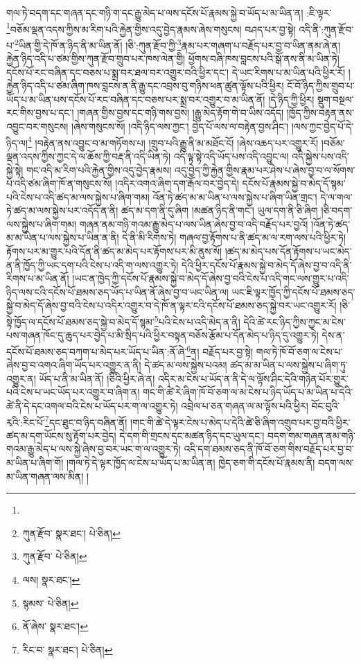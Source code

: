 གལ་ཏེ་བདག་དང་གཞན་དང་གཉི་ག་དང་རྒྱུ་མེད་པ་ལས་དངོས་པོ་རྣམས་སྐྱེ་བ་ཡོད་པ་མ་ཡིན་ན། :ཇི་ལྟར་\footnote{}བཅོམ་ལྡན་འདས་ཀྱིས་མ་རིག་པའི་རྐྱེན་གྱིས་འདུ་བྱེད་རྣམས་ཞེས་གསུངས། བཤད་པར་བྱ་སྟེ། འདི་ནི་:ཀུན་རྫོབ་པ་\footnote{ཀུན་རྫོབ་  སྣར་ཐང་།  པེ་ཅིན། }ཡིན་གྱི་དེ་ཁོ་ན་ཉིད་ནི་མ་ཡིན་ནོ། །ཅི་:ཀུན་རྫོབ་ཀྱི་\footnote{ཀུན་རྫོབ་  པེ་ཅིན། }རྣམ་པར་གཞག་པ་བརྗོད་པར་བྱ་བ་ཡིན་ནམ་ཞེ་ན། རྐྱེན་ཉིད་འདི་པ་ཙམ་གྱིས་ཀུན་རྫོབ་གྲུབ་པར་ཁས་ལེན་གྱི། ཕྱོགས་བཞི་ཁས་བླངས་པའི་སྒོ་ནས་ནི་མ་ཡིན་ཏེ། དངོས་པོ་རང་བཞིན་དང་བཅས་པ་སྨྲ་བར་ཐལ་བར་འགྱུར་བའི་ཕྱིར་དང་། དེ་ཡང་རིགས་པ་མ་ཡིན་པའི་ཕྱིར་རོ། །རྐྱེན་ཉིད་འདི་པ་ཙམ་ཞིག་ཁས་བླངས་ན་ནི་རྒྱུ་དང་འབྲས་བུ་གཉིས་ཕན་ཚུན་ལྟོས་པའི་ཕྱིར། ངོ་བོ་ཉིད་ཀྱིས་གྲུབ་པ་ཡོད་པ་མ་ཡིན་པས་དངོས་པོ་རང་བཞིན་དང་བཅས་པར་སྨྲ་བར་འགྱུར་བ་མ་ཡིན་ནོ། །དེ་ཉིད་ཀྱི་ཕྱིར། སྡུག་བསྔལ་རང་གིས་བྱས་པ་དང་། །གཞན་གྱིས་བྱས་དང་གཉི་གས་བྱས། །རྒྱུ་མེད་རྟོག་གེ་བ་ཡིས་འདོད། །ཁྱོད་ཀྱིས་བརྟན་ནས་འབྱུང་བར་གསུངས། །ཞེས་གསུངས་སོ། །འདི་ཉིད་ལས་ཀྱང་། བྱེད་པོ་ལས་ལ་བརྟེན་བྱས་ཤིང་། །ལས་ཀྱང་བྱེད་པོ་དེ་ཉིད་ལ།\footnote{ལས།  སྣར་ཐང་། } །བརྟེན་ནས་འབྱུང་བ་མ་གཏོགས་པ། །གྲུབ་པའི་རྒྱུ་ནི་མ་མཐོང་ངོ། །ཞེས་འཆད་པར་འགྱུར་རོ། །བཅོམ་ལྡན་འདས་ཀྱིས་ཀྱང་དེ་ལ་ཆོས་ཀྱི་བརྡ་ནི་འདི་ཡིན་ཏེ། འདི་ལྟ་སྟེ་འདི་ཡོད་པས་འདི་འབྱུང་ལ། འདི་སྐྱེས་པས་འདི་སྐྱེ་སྟེ། གང་འདི་མ་རིག་པའི་རྐྱེན་གྱིས་འདུ་བྱེད་རྣམས། འདུ་བྱེད་ཀྱི་རྐྱེན་གྱིས་རྣམ་པར་ཤེས་པ་ཞེས་བྱ་བ་ལ་སོགས་པ་འདི་ཙམ་ཞིག་ཁོ་ན་གསུངས་སོ། །འདིར་འགའ་ཞིག་དག་རྒོལ་བར་བྱེད་དེ། དངོས་པོ་རྣམས་སྐྱེ་བ་མེད་དོ་སྙམ་པའི་ངེས་པ་འདི་ཚད་མ་ལས་སྐྱེས་པ་ཞིག་གམ། འོན་ཏེ་ཚད་མ་མ་ཡིན་པ་ལས་སྐྱེས་པ་ཞིག་ཡིན་གྲང་། དེ་ལ་གལ་ཏེ་ཚད་མ་ལས་སྐྱེས་པར་འདོད་ན་ནི། ཚད་མ་དག་ནི་དུ་ཞིག །མཚན་ཉིད་ནི་གང་། ཡུལ་དག་ནི་ཅི་ཞིག །ཅི་བདག་ལས་སྐྱེས་པ་ཞིག་གམ། གཞན་ནམ་གཉི་གའམ་རྒྱུ་མེད་པ་ལས་ཡིན་ཞེས་བྱ་བ་འདི་བརྗོད་པར་བྱའོ། །འོན་ཏེ་ཚད་མ་མ་ཡིན་པ་ལས་སྐྱེས་པ་ཡིན་ན་ནི། དེ་ནི་མི་རིགས་ཏེ། གཞལ་བྱ་རྟོགས་པ་ནི་ཚད་མ་ལ་རག་ལས་པའི་ཕྱིར་ཏེ། རྟོགས་པར་མ་གྱུར་པའི་དོན་ནི་ཚད་མ་མེད་པར་རྟོགས་པར་མི་ནུས་སོ། །ཚད་མ་མེད་པས་དོན་རྟོགས་པ་ཡང་མེད་ན་ནི་ཁྱོད་ཀྱི་ཡང་དག་པའི་ངེས་པ་འདི་ག་ལས་འགྱུར་ཏེ། དེའི་ཕྱིར་དངོས་པོ་རྣམས་སྐྱེ་བ་མེད་དོ་ཞེས་བྱ་བ་འདི་ནི་རིགས་པ་མ་ཡིན་ནོ། །ཡང་ན་ཁྱེད་ཀྱི་དངོས་པོ་རྣམས་སྐྱེ་བ་མེད་དོ་ཞེས་བྱ་བའི་ངེས་པ་འདི་གང་ལས་གྱུར་པ་འདི་ཉིད་ལས་ངའི་དངོས་པོ་ཐམས་ཅད་ཡོད་པ་ཡིན་ནོ་ཞེས་བྱ་བ་ཡང་ཡིན་ལ། ཡང་ཇི་ལྟར་ཁྱོད་ཀྱི་དངོས་པོ་ཐམས་ཅད་སྐྱེ་བ་མེད་དོ་ཞེས་བྱ་བའི་ངེས་པ་འདིར་འགྱུར་བ་དེ་ཁོ་ན་ལྟར་ངའི་དངོས་པོ་ཐམས་ཅད་སྐྱེ་བར་ཡང་འགྱུར་རོ། །ཅི་སྟེ་ཁྱོད་ལ་དངོས་པོ་ཐམས་ཅད་སྐྱེ་བ་མེད་དོ་སྙམ་\footnote{སྙམས་  པེ་ཅིན། }པའི་ངེས་པ་འདི་མེད་ན་ནི། དེའི་ཚེ་རང་ཉིད་ཀྱིས་ཀྱང་མ་ངེས་པས་གཞན་ཁོང་དུ་ཆུད་པར་བྱེད་པ་མི་སྲིད་པའི་ཕྱིར་བསྟན་བཅོས་རྩོམ་པ་དོན་མེད་པ་ཉིད་དུ་འགྱུར་ཏེ། དེས་ན་དངོས་པོ་ཐམས་ཅད་བཀག་པ་མེད་པར་ཡོད་པ་ཡིན་:ནོ་ཞེ་\footnote{ནོ་ཞེས་  སྣར་ཐང་། }ན། བརྗོད་པར་བྱ་སྟེ། གལ་ཏེ་ཁོ་བོ་ཅག་ལ་ངེས་པ་ཞེས་བྱ་བ་འགའ་ཞིག་ཡོད་པར་འགྱུར་ན་ནི། དེ་ཚད་མ་ལས་སྐྱེས་པའམ། ཚད་མ་མ་ཡིན་པ་ལས་སྐྱེས་པ་ཞིག་ཏུ་འགྱུར་ན། ཡོད་པ་ནི་མ་ཡིན་ནོ། །ཅིའི་ཕྱིར་ཞེ་ན། འདིར་མ་ངེས་པ་ཡོད་ན་ནི་དེ་ལ་ལྟོས་ཤིང་དེའི་གཉེན་པོར་གྱུར་པའི་ངེས་པ་ཡང་ཡོད་པར་འགྱུར་བ་ཞིག་ན། གང་གི་ཚེ་རེ་ཞིག་ཁོ་བོ་ཅག་ལ་མ་ངེས་པ་ཉིད་ཡོད་པ་མ་ཡིན་པ་དེའི་ཚེ་ནི་དེ་དང་འགལ་བའི་ངེས་པ་ཡོད་པར་ག་ལ་འགྱུར་ཏེ། འབྲེལ་པ་ཅན་གཞན་ལ་མ་ལྟོས་པའི་ཕྱིར། བོང་བུའི་རྭའི་:རིང་པོ་\footnote{རིང་བ་  སྣར་ཐང་།  པེ་ཅིན། }དང་ཐུང་བ་ཉིད་བཞིན་ནོ། །གང་གི་ཚེ་དེ་ལྟར་ངེས་པ་མེད་པ་དེའི་ཚེ་ཅི་ཞིག་འགྲུབ་པར་བྱ་བའི་ཕྱིར་ཚད་མ་དག་ཡོངས་སུ་རྟོག་པར་བྱེད། དེ་དག་གི་གྲངས་དང་མཚན་ཉིད་དང་ཡུལ་དང་། བདག་གམ་གཞན་ནམ་གཉི་གའམ་རྒྱུ་མེད་པ་ལས་སྐྱེ་ཞེས་བྱ་བར་ཡང་ག་ལ་འགྱུར་ཏེ། འདི་དག་ཐམས་ཅད་ནི་ཁོ་བོ་ཅག་གིས་བརྗོད་པར་བྱ་བ་མ་ཡིན་པ་ཞིག་གོ། །གལ་ཏེ་དེ་ལྟར་ཁྱོད་ལ་ངེས་པ་ཡོད་པ་མ་ཡིན་ན། ཁྱེད་ཅག་གི་དངོས་པོ་རྣམས་ནི། བདག་ལས་མ་ཡིན་གཞན་ལས་མིན། །
